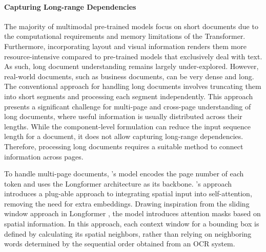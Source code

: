 \paragraph{Capturing Long-range Dependencies}

The majority of multimodal pre-trained models focus on short documents due to the computational requirements and memory limitations of the Transformer. Furthermore, incorporating layout and visual information renders them more resource-intensive compared to pre-trained models that exclusively deal with text. As such, long document understanding remains largely under-explored. However, real-world documents, such as business documents, can be very dense and long. The conventional approach for handling long documents involves truncating them into short segments and processing each segment independently. This approach presents a significant challenge for multi-page and cross-page understanding of long documents, where useful information is usually distributed across their lengths. While the component-level formulation \citep{li2021structurallm, li2021selfdoc} can reduce the input sequence length for a document, it does not allow capturing long-range dependencies. Therefore, processing long documents requires a suitable method to connect information across pages.

To handle multi-page documents, \citet{pramanik2020towards}'s model encodes the page number of each token and uses the Longformer architecture as its backbone. \citet{pham2022understanding}'s approach introduces a plug-able approach to integrating spatial input into self-attention, removing the need for extra embeddings. Drawing inspiration from the sliding window approach in Longformer \citep{beltagy2020longformer}, the model introduces attention masks based on spatial information. In this approach, each context window for a bounding box is defined by calculating its spatial neighbors, rather than relying on neighboring words determined by the sequential order obtained from an \ac{OCR} system. \\



